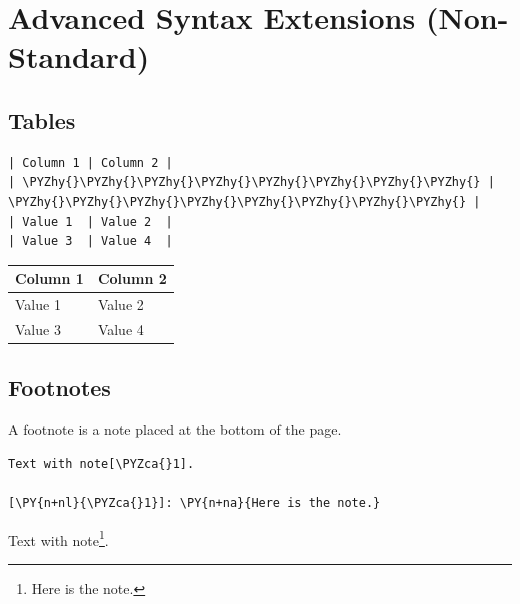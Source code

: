 \documentclass[a4paper,twoside]{article}
\begin{document}
\section{Advanced Syntax Extensions (Non-Standard)}
\subsection{Tables}
\begin{tscode}[lang=md, engine=pygments]
\begin{Verbatim}[commandchars=\\\{\},breaklines, breakanywhere, commandchars=\\\{\}]
| Column 1 | Column 2 |
| \PYZhy{}\PYZhy{}\PYZhy{}\PYZhy{}\PYZhy{}\PYZhy{}\PYZhy{}\PYZhy{} | \PYZhy{}\PYZhy{}\PYZhy{}\PYZhy{}\PYZhy{}\PYZhy{}\PYZhy{}\PYZhy{} |
| Value 1  | Value 2  |
| Value 3  | Value 4  |
\end{Verbatim}
\end{tscode}
\begin{displayquote}
\begin{center}
\begin{tabularx}{\linewidth}{>{\raggedright\arraybackslash}X>{\raggedright\arraybackslash}X}
\toprule
\textbf{Column 1} & \textbf{Column 2} \\
\midrule
Value 1 & Value 2 \\
Value 3 & Value 4 \\
\bottomrule
\end{tabularx}
\end{center}
\end{displayquote}
\subsection{Footnotes}
A footnote is a note placed at the bottom of the page.
\begin{tscode}[lang=md, engine=pygments]
\begin{Verbatim}[commandchars=\\\{\},breaklines, breakanywhere, commandchars=\\\{\}]
Text with note[\PYZca{}1].

[\PY{n+nl}{\PYZca{}1}]: \PY{n+na}{Here is the note.}
\end{Verbatim}
\end{tscode}
\begin{displayquote}
Text with note\footnote{Here is the note.}.
\end{displayquote}
\end{document}
